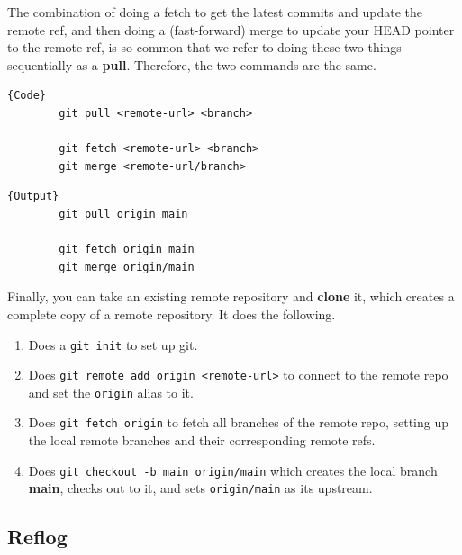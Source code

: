   \begin{definition}[Pull]
    The combination of doing a fetch to get the latest commits and update the remote ref, and then doing a (fast-forward) merge to update your HEAD pointer to the remote ref, is so common that we refer to doing these two things sequentially as a \textbf{pull}. Therefore, the two commands are the same. 

    \noindent\begin{minipage}{.5\textwidth}
      \begin{lstlisting}[]{Code}
        git pull <remote-url> <branch> 

        git fetch <remote-url> <branch>  
        git merge <remote-url/branch>
      \end{lstlisting}
      \end{minipage}
      \hfill
      \begin{minipage}{.49\textwidth}
      \begin{lstlisting}[]{Output}
        git pull origin main 

        git fetch origin main 
        git merge origin/main
      \end{lstlisting}
    \end{minipage}
  \end{definition}

  \begin{definition}[Clone]
    Finally, you can take an existing remote repository and \textbf{clone} it, which creates a complete copy of a remote repository. It does the following. 
    \begin{enumerate}
      \item Does a \texttt{git init} to set up git. 
      \item Does \texttt{git remote add origin <remote-url>} to connect to the remote repo and set the \texttt{origin} alias to it. 
      \item Does \texttt{git fetch origin} to fetch all branches of the remote repo, setting up the local remote branches and their corresponding remote refs. 
      \item Does \texttt{git checkout -b main origin/main} which creates the local branch \textbf{main}, checks out to it, and sets \texttt{origin/main} as its upstream. 
    \end{enumerate}
  \end{definition}

\subsection{Reflog} 

